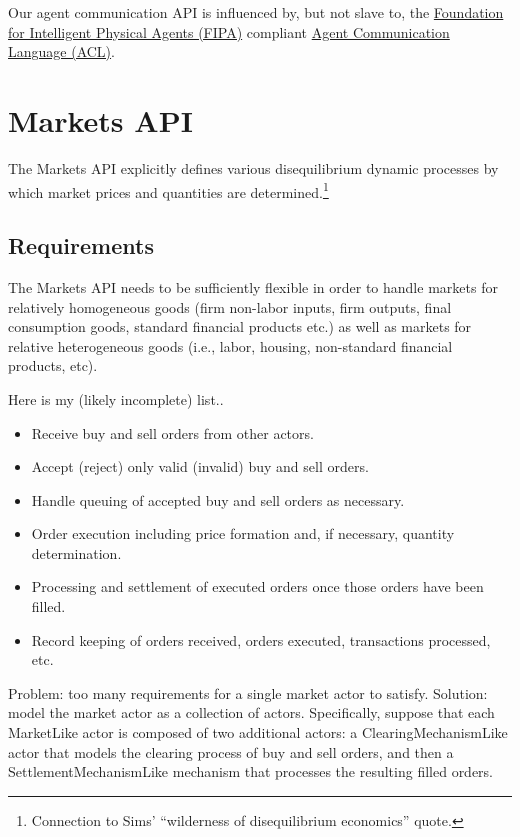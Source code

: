 \documentclass[11pt]{amsart}
\begin{document}
Our agent communication API is influenced by, but not slave to, the \href{http://www.fipa.org/}{Foundation for Intelligent Physical Agents (FIPA)} compliant \href{http://www.fipa.org/specs/fipa00037/SC00037J.pdf}{Agent Communication Language (ACL)}.

\section{Markets API}

The Markets API explicitly defines various disequilibrium dynamic processes by which market prices and quantities are determined.\footnote{
%
Connection to Sims' ``wilderness of disequilibrium economics'' quote.
%
}

\subsection{Requirements} The Markets API needs to be sufficiently flexible in order to handle markets for relatively homogeneous goods (firm non-labor inputs, firm outputs, final consumption goods, standard financial products etc.) as well as markets for relative heterogeneous goods (i.e., labor, housing, non-standard financial products, etc).

Here is my (likely incomplete) list..
\begin{itemize}
    \item Receive buy and sell orders from other actors.
    \item Accept (reject) only valid (invalid) buy and sell orders.
    \item Handle queuing of accepted buy and sell orders as necessary.
    \item Order execution including price formation and, if necessary, quantity determination.
    \item Processing and settlement of executed orders once those orders have been filled.
    \item Record keeping of orders received, orders executed, transactions processed, etc.
\end{itemize}

Problem: too many requirements for a single market actor to satisfy. Solution: model the market actor as a collection of actors. Specifically, suppose that each MarketLike actor is composed of two additional actors: a ClearingMechanismLike actor that models the clearing process of buy and sell orders, and then a SettlementMechanismLike mechanism that processes the resulting filled orders.
\end{document}
